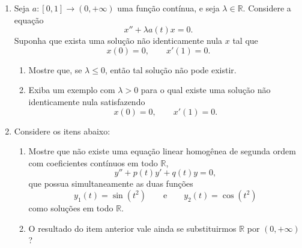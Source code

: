\documentclass[a4paper,
11pt,  reqno]{amsart}
\begin{document}
\begin{enumerate}
\begin{enumerate}
    \item Verifique que $y_1(t)=t$ é uma solução da equação homogênea associada.

    \item Encontre uma segunda solução $y_2$ da equação homogênea que seja linearmente independente de $y_1$.

    \item Encontre a solução geral da equação não homogênea.

\end{enumerate}

\vspace{2mm}


\item Seja $a:[0,1]\to(0,+\infty)$ uma função contínua, e seja $\lambda\in\mathbb{R}$. Considere a equação
\[
    x''+\lambda a(t)x=0.
\]
Suponha que exista uma solução não identicamente nula $x$ tal que
\[
    x(0)=0,
    \qquad
    x'(1)=0.
\]

\begin{enumerate}
    \item Mostre que, se $\lambda\leq 0$, então tal solução não pode existir.

    \item Exiba um exemplo com $\lambda>0$ para o qual existe uma solução não identicamente nula satisfazendo
    \[
        x(0)=0,
        \qquad
        x'(1)=0.
    \]

\end{enumerate}

\vspace{6mm}
\newpage

\item Considere os itens abaixo:

\begin{enumerate}
    \item Mostre que não existe uma equação linear homogênea de segunda ordem com coeficientes contínuos em todo $\mathbb{R}$,
\[
    y''+p(t)y'+q(t)y=0,
\]
que possua simultaneamente as duas funções
\[
    y_1(t)=\sin(t^2)
    \qquad\text{e}\qquad
    y_2(t)=\cos(t^2)
\]
como soluções em todo $\mathbb{R}$.

    \item O resultado do item anterior vale ainda se substituirmos $\mathbb{R}$ por $(0,+\infty)$? 
\end{enumerate}




\end{enumerate}
\end{document}
